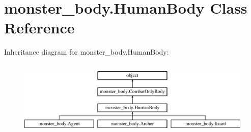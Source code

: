 \hypertarget{classmonster__body_1_1_human_body}{}\section{monster\+\_\+body.\+Human\+Body Class Reference}
\label{classmonster__body_1_1_human_body}
Inheritance diagram for monster\+\_\+body.\+Human\+Body\+:\begin{figure}[H]
\begin{center}
\leavevmode
\includegraphics[height=3.714760cm]{classmonster__body_1_1_human_body}
\end{center}
\end{figure}
